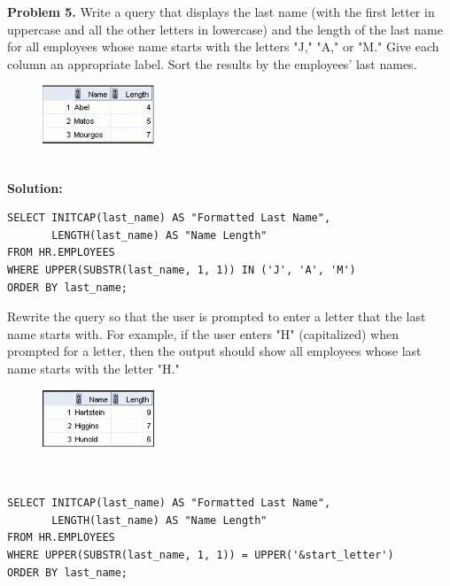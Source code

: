 \documentclass[12pt,a4paper]{article}
\begin{document}
\textbf{Problem 5.} Write a query that displays the last name (with the first letter in uppercase and all the other letters in lowercase) and the length of the last name for all employees whose name starts with the letters "J," "A," or "M." Give each column an appropriate label. Sort the results by the employees' last names.
\begin{figure}[htbp]
  \centering
  \includegraphics[width=0.3\textwidth]{Screenshots/35_1.png}
\end{figure}\\
\textbf{Solution:}
\begin{lstlisting}[style=sqlstyle]
SELECT INITCAP(last_name) AS "Formatted Last Name",
       LENGTH(last_name) AS "Name Length"
FROM HR.EMPLOYEES
WHERE UPPER(SUBSTR(last_name, 1, 1)) IN ('J', 'A', 'M')
ORDER BY last_name;
\end{lstlisting}

Rewrite the query so that the user is prompted to enter a letter that the last name starts with. For example, if the user enters "H" (capitalized) when prompted for a letter, then the output should show all employees whose last name starts with the letter "H."
\begin{figure}[htbp]
  \centering
  \includegraphics[width=0.3\textwidth]{Screenshots/35_2.png}
\end{figure}\\
\begin{lstlisting}[style=sqlstyle]
SELECT INITCAP(last_name) AS "Formatted Last Name",
       LENGTH(last_name) AS "Name Length"
FROM HR.EMPLOYEES
WHERE UPPER(SUBSTR(last_name, 1, 1)) = UPPER('&start_letter')
ORDER BY last_name;
\end{lstlisting}
\end{document}
